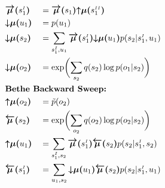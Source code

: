 \documentclass[fleqn]{article}
\begin{document}
\begin{minipage}[t]{0.5\textwidth}
\begin{alignat}{2}
         & \bm{\overrightarrow{\mu}(}s^{\scriptscriptstyle I}_1\bm{)} &  & = \bm{\overrightarrow{\mu}(}s_1\bm{)} \bm{{\uparrow}{\mu}(}s^{\scriptscriptstyle II}_1\bm{)}                                                                                   \\
         & \bm{{\downarrow}{\mu}(}u_1\bm{)}                           &  & = p(u_1)                                                                                                                                                                       \\
         & \bm{{\downarrow}{\mu}(}s_2\bm{)}                           &  & = \sum_{s^{\scriptscriptstyle I}_1, u_1} \bm{\overrightarrow{\mu}(}s^{\scriptscriptstyle I}_1\bm{)} \bm{{\downarrow}{\mu}(}u_1\bm{)} p(s_2|{s^{\scriptscriptstyle I}_1},u_1)   \\
         & \bm{{\downarrow}{\mu}(}o_2\bm{)}                           &  & = \exp \biggl( \sum_{s_2} q(s_2) \log p(o_1|s_2) \biggr)                                                                                                                       \\
         & \rlap{\text{\bfseries Bethe Backward Sweep:}} \nonumber                                                                                                                                                                                        \\
         & \bm{{\uparrow}{\mu}(}o_2\bm{)}                             &  & = \tilde{p}(o_2)                                                                                                                                                               \\
         & \bm{\overleftarrow{\mu}(}s_2\bm{)}                         &  & = \exp \biggl(\sum_{o_2} q(o_2)\log p(o_2|s_2)\biggr)                                                                                                                          \\
         & \bm{{\uparrow}{\mu}(}u_1\bm{)}                             &  & = \sum_{s^{\scriptscriptstyle I}_1, s_2} \bm{\overrightarrow{\mu}(}s^{\scriptscriptstyle I}_1\bm{)} \bm{\overleftarrow{\mu}(}s_2\bm{)} p(s_2|{s^{\scriptscriptstyle I}_1},s_2) \\
         & \bm{\overleftarrow{\mu}(}s^{\scriptscriptstyle I}_1\bm{)}  &  & = \sum_{u_1, s_2} \bm{{\downarrow}{\mu}(}u_1\bm{)} \bm{\overleftarrow{\mu}(}s_2\bm{)} p(s_2|s^{\scriptscriptstyle I}_1,u_1)
    \end{alignat}
\end{minipage}%
\end{document}
